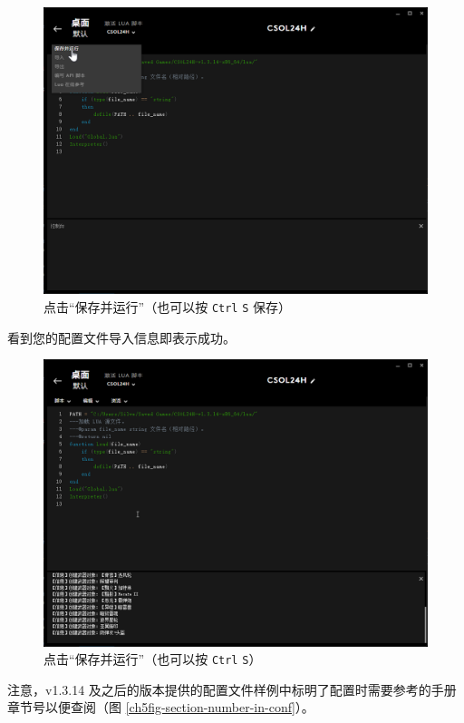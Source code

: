 \begin{figure}[H]
    \Centering
    \includegraphics[width=\textwidth]{docs/assets/update/save_and_run_00.png}
    \caption{点击“保存并运行”（也可以按 \lstinline{Ctrl} \lstinline{S} 保存）}
\end{figure}

看到您的配置文件导入信息即表示成功。

\begin{figure}[H]
    \Centering
    \includegraphics[width=\textwidth]{docs/assets/update/save_and_run_01.png}
    \caption{点击“保存并运行”（也可以按 \lstinline{Ctrl} \lstinline{S}）}
\end{figure}

注意，v1.3.14 及之后的版本提供的配置文件样例中标明了配置时需要参考的手册章节号以便查阅（图 \ref{ch5fig-section-number-in-conf}）。

